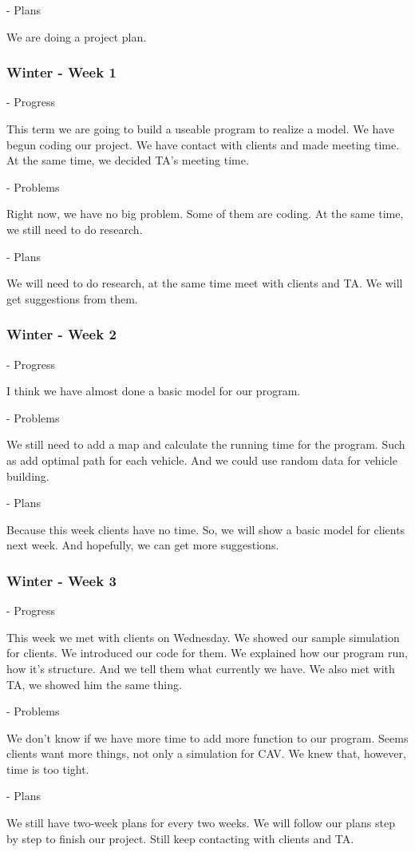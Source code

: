 \documentclass[onecolumn, draftclsnofoot,10pt, compsoc]{IEEEtran}
\begin{document}
- Plans

We are doing a project plan.
\subsubsection{Winter - Week 1}
- Progress

This term we are going to build a useable program to realize a model.
We have begun coding our project.
We have contact with clients and made meeting time.
At the same time, we decided TA's meeting time.

- Problems

Right now, we have no big problem.
Some of them are coding.
At the same time, we still need to do research.

- Plans

We will need to do research, at the same time meet with clients and TA.
We will get suggestions from them.
\subsubsection{Winter - Week 2}
- Progress

I think we have almost done a basic model for our program.

- Problems

We still need to add a map and calculate the running time for the program.
Such as add optimal path for each vehicle.
And we could use random data for vehicle building.

- Plans

Because this week clients have no time.
So, we will show a basic model for clients next week.
And hopefully, we can get more suggestions.
\subsubsection{Winter - Week 3}
- Progress

This week we met with clients on Wednesday.
We showed our sample simulation for clients.
We introduced our code for them.
We explained how our program run, how it's structure.
And we tell them what currently we have.
We also met with TA, we showed him the same thing.

- Problems

We don't know if we have more time to add more function to our program.
Seems clients want more things, not only a simulation for CAV.
We knew that, however, time is too tight.

- Plans

We still have two-week plans for every two weeks.
We will follow our plans step by step to finish our project.
Still keep contacting with clients and TA.
\end{document}
